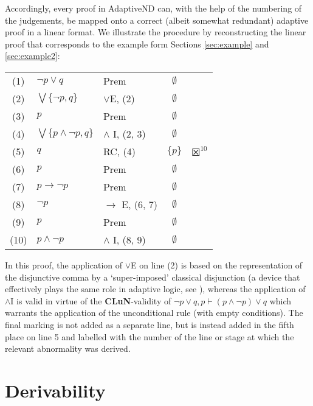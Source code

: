 \documentclass[]{article}
\begin{document}
Accordingly, every proof in \textsf{AdaptiveND} can, with the help of the numbering of the judgements, be mapped onto a correct (albeit somewhat redundant) adaptive proof in a linear format. We illustrate the procedure by reconstructing the linear proof that corresponds to the example form Sections \ref{sec:example} and \ref{sec:example2}:
\begin{center}
    \begin{tabular}{cllcl}
        (1) & $\neg p \vee q$ & Prem & $\emptyset$\\
        (2) & $\bigvee \{\neg p, q\}$ & $\vee$E, (2) & $\emptyset$\\
        (3) & $p$ & Prem & $\emptyset$\\
        (4) & $\bigvee \{p \wedge \neg p, q\}$ & $\wedge$ I, (2, 3) & $\emptyset$\\
        (5) & $q$ & RC, (4) & $\{p\}$ & $\XBox^{10}$\\
        (6) & $p$ & Prem & $\emptyset$\\
        (7) & $p \to \neg p$ & Prem & $\emptyset$\\
        (8) & $\neg p$ & $\to$ E, (6, 7) & $\emptyset$\\
        (9) & $p$ & Prem & $\emptyset$\\
        (10) & $p \wedge \neg p$ & $\wedge$ I, (8, 9) & $\emptyset$\\
    \end{tabular}
\end{center}
In this proof, the application of $\vee$E on line (2) is based on the representation of the disjunctive comma by a `super-imposed' classical disjunction (a device that effectively plays the same role in adaptive logic, see \cite[\S 2.2, 2.7]{Strasser:AdaptiveLogicsForDefeasibleReasoning:}), whereas the application of $\wedge$I is valid in virtue of the \textbf{CLuN}-validity of $\neg p \vee q, p \vdash (p \wedge \neg p) \vee q$ which warrants the application of the unconditional rule (with empty conditions). The final marking is not added as a separate line, but is instead added in the fifth place on line 5 and labelled with the number of the line or stage at which the relevant abnormality was derived.

\section{Derivability}\label{sec:meta}
\end{document}
